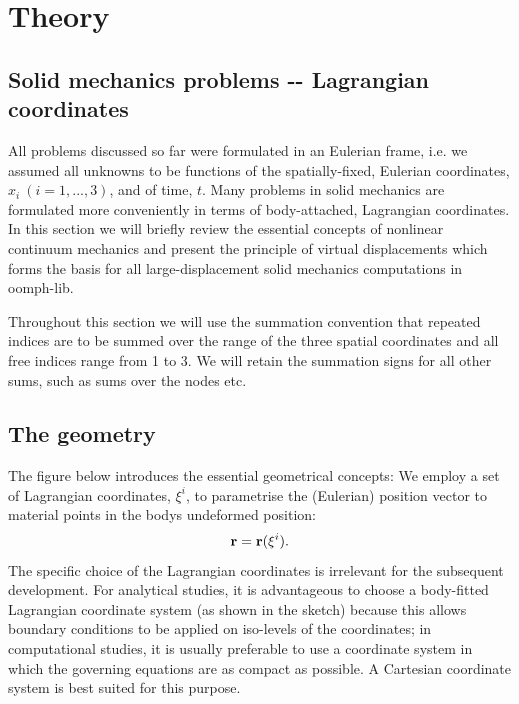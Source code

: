  

\hypertarget{index_theory}{}\section{Theory}\label{index_theory}


\hypertarget{index_solids_lagrange}{}\subsection{Solid mechanics problems -\/-\/ Lagrangian coordinates}\label{index_solids_lagrange}
All problems discussed so far were formulated in an Eulerian frame, i.\+e. we assumed all unknowns to be functions of the spatially-\/fixed, Eulerian coordinates, $x_i \ (i=1,...,3)$, and of time, $ t $. Many problems in solid mechanics are formulated more conveniently in terms of body-\/attached, Lagrangian coordinates. In this section we will briefly review the essential concepts of nonlinear continuum mechanics and present the principle of virtual displacements which forms the basis for all large-\/displacement solid mechanics computations in {\ttfamily oomph-\/lib}.

Throughout this section we will use the summation convention that repeated indices are to be summed over the range of the three spatial coordinates and all free indices range from 1 to 3. We will retain the summation signs for all other sums, such as sums over the nodes etc.



\hypertarget{index_geometry}{}\subsection{The geometry}\label{index_geometry}
The figure below introduces the essential geometrical concepts\+: We employ a set of Lagrangian coordinates, $ \xi^i$, to parametrise the (Eulerian) position vector to material points in the body\textquotesingle{}s undeformed position\+: \[ {\bf r} = {\bf r}(\xi^i). \] The specific choice of the Lagrangian coordinates is irrelevant for the subsequent development. For analytical studies, it is advantageous to choose a body-\/fitted Lagrangian coordinate system (as shown in the sketch) because this allows boundary conditions to be applied on iso-\/levels of the coordinates; in computational studies, it is usually preferable to use a coordinate system in which the governing equations are as compact as possible. A Cartesian coordinate system is best suited for this purpose.

